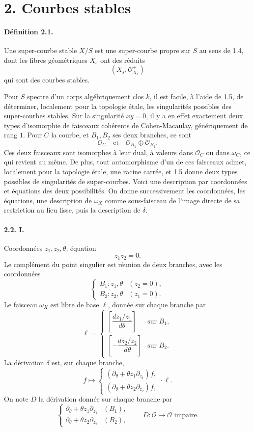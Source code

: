 \documentclass[11pt]{article}
\newcommand{\cO}{\mathcal O}
\begin{document}
\section*{2. Courbes stables}

\paragraph{Définition 2.1.}
Une super-courbe stable $X/S$ est une super-courbe propre sur $S$ au sens de 1.4, dont les fibres géométriques $X_s$ ont des réduits
\[
  (X_s,\cO^+_{X_s})
\]
qui sont des courbes stables.

Pour $S$ spectre d'un corps algébriquement clos $k$, il est facile, à l'aide de 1.5, de déterminer, localement pour la topologie étale, les singularités possibles des super-courbes stables. Sur la singularité $xy=0$, il y a en effet exactement deux types d'isomorphie de faisceaux cohérents de Cohen-Macaulay, génériquement de rang $1$. Pour $C$ la courbe, et $B_1,B_2$ ses deux branches, ce sont
\[
  \cO_C \quad\text{et}\quad \cO_{B_1}\oplus\cO_{B_2}.
\]
Ces deux faisceaux sont isomorphes à leur dual, à valeurs dans $\cO_C$ ou dans $\omega_C$, ce qui revient au même. De plus, tout automorphisme d'un de ces faisceaux admet, localement pour la topologie étale, une racine carrée, et 1.5 donne deux types possibles de singularités de super-courbes. Voici une description par coordonnées et équations des deux possibilités. On donne successivement les coordonnées, les équations, une description de $\omega_X$ comme sous-faisceau de l'image directe de sa restriction au lieu lisse, puis la description de $\delta$.

\paragraph{2.2. I.}
Coordonnées $z_1,z_2,\theta$; équation
\[
  z_1z_2=0.
\]
Le complément du point singulier est réunion de deux branches, avec les coordonnées
\[
  \begin{cases}
  B_1: z_1,\theta &(z_2=0),\\
  B_2: z_2,\theta &(z_1=0).
  \end{cases}
\]
Le faisceau $\omega_X$ est libre de base $\ell$, donnée sur chaque branche par
\[
  \ell=\begin{cases}
  \left[\dfrac{dz_1/z_1}{d\theta}\right] &\text{sur }B_1,\\[1.2ex]
  \left[-\dfrac{dz_2/z_2}{d\theta}\right] &\text{sur }B_2.
  \end{cases}
\]
La dérivation $\delta$ est, sur chaque branche,
\[
  f\longmapsto
  \begin{cases}
  (\partial_\theta+\theta z_1\partial_{z_1})f,\\
  (\partial_\theta+\theta z_2\partial_{z_2})f,
  \end{cases}
  \cdot\ell.
\]
On note $D$ la dérivation donnée sur chaque branche par
\[
  \begin{cases}
  \partial_\theta+\theta z_1\partial_{z_1} &(B_1),\\
  \partial_\theta+\theta z_2\partial_{z_2} &(B_2),
  \end{cases}
  \qquad D:\cO\to\cO\text{ impaire}.
\]
\end{document}
